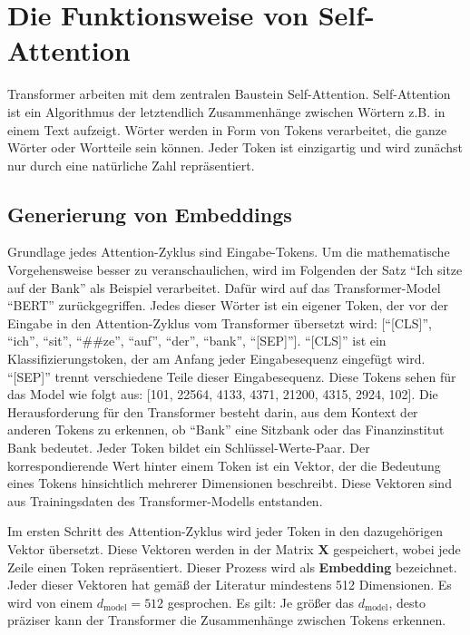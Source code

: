 \chapter{Die Funktionsweise von Self-Attention}

Transformer arbeiten mit dem zentralen Baustein Self-Attention.
Self-Attention ist ein Algorithmus der letztendlich Zusammenhänge zwischen Wörtern z.B. in einem Text aufzeigt.
Wörter werden in Form von Tokens verarbeitet, die ganze Wörter oder Wortteile sein können.
Jeder Token ist einzigartig und wird zunächst nur durch eine natürliche Zahl repräsentiert.

\section{Generierung von Embeddings}

Grundlage jedes Attention-Zyklus sind Eingabe-Tokens.  
Um die mathematische Vorgehensweise besser zu veranschaulichen, wird im Folgenden der Satz \enquote{Ich sitze auf der Bank} als Beispiel verarbeitet.
Dafür wird auf das Transformer-Model \enquote{BERT} zurückgegriffen.
Jedes dieser Wörter ist ein eigener Token, der vor der Eingabe in den Attention-Zyklus vom Transformer übersetzt wird:
[\enquote{[CLS]}, \enquote{ich}, \enquote{sit}, \enquote{##ze}, \enquote{auf}, \enquote{der}, \enquote{bank}, \enquote{[SEP]}].  
\enquote{[CLS]} ist ein Klassifizierungstoken, der am Anfang jeder Eingabesequenz eingefügt wird.
\enquote{[SEP]} trennt verschiedene Teile dieser Eingabesequenz.
Diese Tokens sehen für das Model wie folgt aus: [101, 22564, 4133, 4371, 21200, 4315, 2924, 102].
Die Herausforderung für den Transformer besteht darin, aus dem Kontext der anderen Tokens zu erkennen, ob \enquote{Bank} eine Sitzbank oder das Finanzinstitut Bank bedeutet.
Jeder Token bildet ein Schlüssel-Werte-Paar.
Der korrespondierende Wert hinter einem Token ist ein Vektor, der die Bedeutung eines Tokens hinsichtlich mehrerer Dimensionen beschreibt.  
Diese Vektoren sind aus Trainingsdaten des Transformer-Modells entstanden.

Im ersten Schritt des Attention-Zyklus wird jeder Token in den dazugehörigen Vektor übersetzt.  
Diese Vektoren werden in der Matrix $\mathbf{X}$ gespeichert, wobei jede Zeile einen Token repräsentiert.  
Dieser Prozess wird als \textbf{Embedding} bezeichnet.  
Jeder dieser Vektoren hat gemäß der Literatur mindestens 512 Dimensionen.  
Es wird von einem \( d_{\text{model}} = 512 \) gesprochen.  
Es gilt: Je größer das \( d_{\text{model}} \), desto präziser kann der Transformer die Zusammenhänge zwischen Tokens erkennen.

